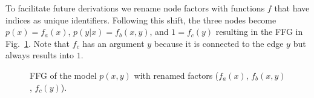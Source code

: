 To facilitate future derivations we rename node factors with functions \(f\) that have indices as unique identifiers. Following this shift, the three nodes become \(p(x)=f_a(x)\), \(p(y|x)=f_b(x,y)\), and \(1=f_c(y)\) resulting in the FFG in Fig.~\ref{fig:3}. Note that \(f_c\) has an argument \(y\) because it is connected to the edge \(y\) but always results into \(1\).
\begin{figure}[htbp]
    \centering


    \caption{FFG of the model \(p(x,y)\) with renamed factors (\(f_a(x)\), \(f_b(x,y)\), \(f_c(y)\)).}
    \label{fig:3}
\end{figure}

